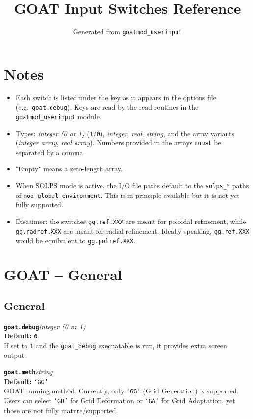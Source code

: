 \documentclass[10pt,a4paper]{article}
\title{GOAT Input Switches Reference}
\author{Generated from \texttt{goatmod\_userinput}}
\date{}
\newcommand{\sw}[4]{%
  \par\vspace{0.7em}%
  \begin{minipage}{\linewidth}\raggedright
    \textbf{\texttt{#1}}\hfill\textit{#2}\\[0.1em]
    \textbf{Default:} #3\\[0.1em]
    #4\par
    \vspace{0.3em}{\color{swgrey}\hrule}
  \end{minipage}\par}
\begin{document}
\maketitle
\tableofcontents

\section*{Notes}
\begin{itemize}
  \item Each switch is listed under the key as it appears in the options file (e.g.\ \texttt{goat.debug}). Keys are read by the read routines in the \texttt{goatmod\_userinput} module.
  \item Types: \emph{integer (0 or 1)} (\texttt{1}/\texttt{0}), \emph{integer}, \emph{real}, \emph{string}, and the array variants (\emph{integer array}, \emph{real array}). Numbers provided in the arrays \textbf{must} be separated by a comma.
  \item "Empty" means a zero-length array.
  \item When SOLPS mode is active, the I/O file paths default to the \texttt{solps\_*} paths of \texttt{mod\_global\_environment}. This is in principle available but it is not yet fully supported.
  \item Discaimer: the switches \texttt{gg.ref.XXX} are meant for poloidal refinement, while \texttt{gg.radref.XXX} are meant for radial refinement. Ideally speaking, \texttt{gg.ref.XXX} would be equilvalent to \texttt{gg.polref.XXX}.
\end{itemize}

\section{GOAT -- General}
\subsection*{General}
\sw{goat.debug}{integer (0 or 1)}{\texttt{0}}{If set to \texttt{1} and the \texttt{goat_debug} execuatable is run, it provides extra screen output.}
\sw{goat.meth}{string}{\texttt{`GG'}}{GOAT running method. Currently, only \texttt{`GG'} (Grid Generation) is supported. Users can select \texttt{`GD'} for Grid Deformation or \texttt{`GA'} for Grid Adaptation, yet those are not fully mature/supported.}
\end{document}
